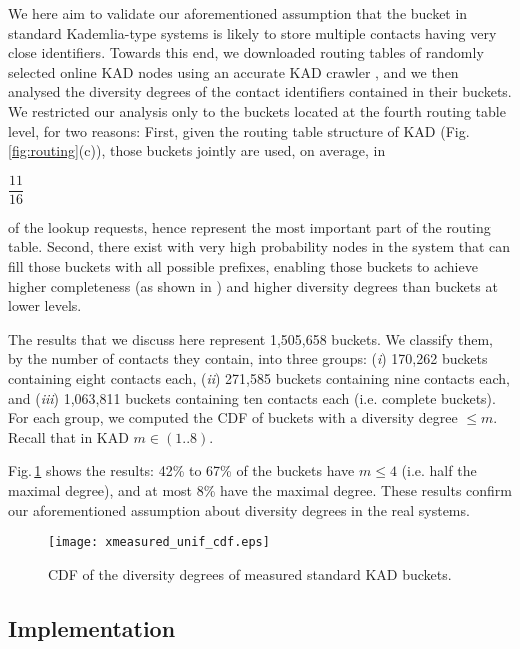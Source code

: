 \documentclass[10pt, conference, compsocconf, letterpaper]{IEEEtran}
\begin{document}
We here aim to validate our aforementioned assumption that the bucket in standard Kademlia-type systems is likely to store multiple contacts having very close identifiers.   
Towards this end, we downloaded routing tables of randomly selected online KAD nodes using an accurate KAD crawler \cite{salah13capturing}, and we then analysed the diversity degrees of the contact identifiers contained in their buckets. We restricted our analysis only to the buckets located at the fourth routing table level, for two reasons: First, given the routing table structure of KAD (Fig.\,\ref{fig:routing}(c)), those buckets jointly are used, on average, in \begin{footnotesize}$\dfrac{11}{16}$\end{footnotesize} of the lookup requests, hence represent the most important part of the routing table.
Second, there exist with very high probability nodes in the system that can fill those buckets with all possible prefixes, enabling those buckets to achieve higher completeness (as shown in \cite{stutzbach06improving}) and higher diversity degrees than buckets at lower levels. 

The results that we discuss here represent 1,505,658 buckets. We classify them, by the number of contacts they contain, into three groups: (\emph{i}) 170,262 buckets containing eight contacts each, (\emph{ii}) 271,585 buckets containing nine contacts each, and (\emph{iii}) 1,063,811 buckets containing ten contacts each (i.e. complete buckets). For each group, we computed the CDF of buckets with a diversity degree $\leq m$. Recall that in KAD $m \in (1..8)$. 

Fig.\,\ref{fig:measured_unif_cdf} shows the results: 42\% to 67\% of the buckets have $m \leq 4$ (i.e. half the maximal degree), and at most 8\% have the maximal degree. These results confirm our aforementioned assumption about diversity degrees in the real systems.

\begin{figure} \centering
\captionsetup{font=scriptsize}
   \texttt{[image: xmeasured\_unif\_cdf.eps]}
   \caption{CDF of the diversity degrees of measured standard KAD buckets.}
   \label{fig:measured_unif_cdf}
\end{figure}

\subsection{Implementation} \label{subsec:increasing}
\end{document}
